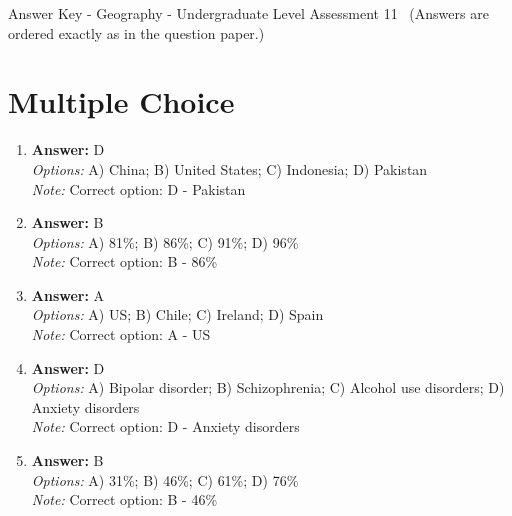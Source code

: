 \documentclass[12pt]{article}
\begin{document}
\begin{center}
Answer Key - Geography - Undergraduate Level Assessment 11 \
\small (Answers are ordered exactly as in the question paper.)
\end{center}

\section*{Multiple Choice}
\begin{enumerate}[label=\arabic*.]
\item \textbf{Answer:} D
\\ \textit{Options:} A) China; B) United States; C) Indonesia; D) Pakistan
\\ \textit{Note:} Correct option: D - Pakistan
\item \textbf{Answer:} B
\\ \textit{Options:} A) 81\%; B) 86\%; C) 91\%; D) 96\%
\\ \textit{Note:} Correct option: B - 86\%
\item \textbf{Answer:} A
\\ \textit{Options:} A) US; B) Chile; C) Ireland; D) Spain
\\ \textit{Note:} Correct option: A - US
\item \textbf{Answer:} D
\\ \textit{Options:} A) Bipolar disorder; B) Schizophrenia; C) Alcohol use disorders; D) Anxiety disorders
\\ \textit{Note:} Correct option: D - Anxiety disorders
\item \textbf{Answer:} B
\\ \textit{Options:} A) 31\%; B) 46\%; C) 61\%; D) 76\%
\\ \textit{Note:} Correct option: B - 46\%
\end{enumerate}
\end{document}
